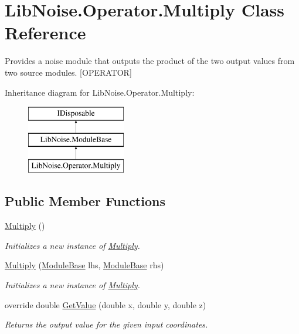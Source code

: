 \hypertarget{class_lib_noise_1_1_operator_1_1_multiply}{}\section{Lib\+Noise.\+Operator.\+Multiply Class Reference}
\label{class_lib_noise_1_1_operator_1_1_multiply}


Provides a noise module that outputs the product of the two output values from two source modules. \mbox{[}O\+P\+E\+R\+A\+T\+OR\mbox{]}  


Inheritance diagram for Lib\+Noise.\+Operator.\+Multiply\+:\begin{figure}[H]
\begin{center}
\leavevmode
\includegraphics[height=3.000000cm]{class_lib_noise_1_1_operator_1_1_multiply}
\end{center}
\end{figure}
\subsection*{Public Member Functions}
\begin{DoxyCompactItemize}
\item 
\hyperlink{class_lib_noise_1_1_operator_1_1_multiply_aac14197bc714aba00fefa50ed89a59d6}{Multiply} ()
\begin{DoxyCompactList}\small\item\em Initializes a new instance of \hyperlink{class_lib_noise_1_1_operator_1_1_multiply}{Multiply}. \end{DoxyCompactList}\item 
\hyperlink{class_lib_noise_1_1_operator_1_1_multiply_aed0c9e75c0d2852c831d5c3f1753d99f}{Multiply} (\hyperlink{class_lib_noise_1_1_module_base}{Module\+Base} lhs, \hyperlink{class_lib_noise_1_1_module_base}{Module\+Base} rhs)
\begin{DoxyCompactList}\small\item\em Initializes a new instance of \hyperlink{class_lib_noise_1_1_operator_1_1_multiply}{Multiply}. \end{DoxyCompactList}\item 
override double \hyperlink{class_lib_noise_1_1_operator_1_1_multiply_ac7f485da38c98500bebdec037abd09ba}{Get\+Value} (double x, double y, double z)
\begin{DoxyCompactList}\small\item\em Returns the output value for the given input coordinates. \end{DoxyCompactList}\end{DoxyCompactItemize}
